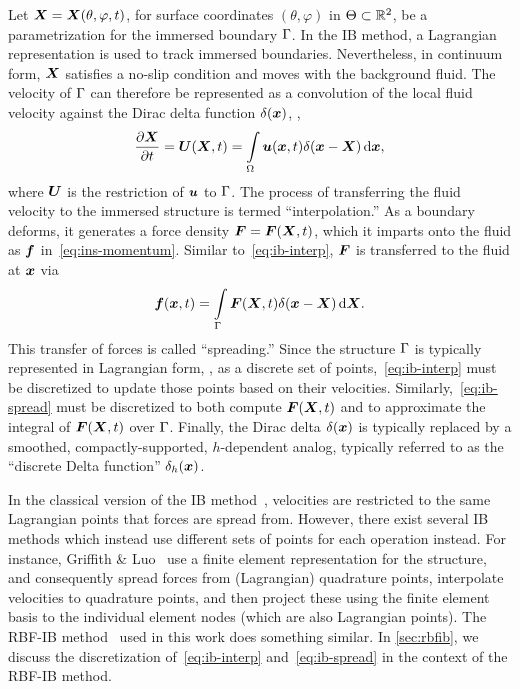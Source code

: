 Let $\boldsymbol{X} = \boldsymbol{X}(\theta, \varphi, t)$, for surface coordinates $(\theta, \varphi)$ in $\Theta\subset\mathbb{R}^2$, be a
parametrization for the immersed boundary $\Gamma$. In the IB method, a Lagrangian representation is used to
track immersed boundaries.  Nevertheless, in continuum form, $\boldsymbol{X}$ satisfies a no-slip condition and moves with the
background fluid. The velocity of $\Gamma$ can therefore be represented as a convolution of the local fluid
velocity against the Dirac delta function $\delta(\boldsymbol{x})$, ,
\begin{equation}\label{eq:ib-interp}
    \frac{\partial \X}{\partial t} = \U(\X, t) %
        = \int\limits_{\domain} \u(\x, t) \Dirac(\x-\X) \d\x,
\end{equation}
where $\boldsymbol{U}$ is the restriction of $\boldsymbol{u}$ to $\Gamma$.
The process of transferring the fluid velocity to the immersed structure is termed ``interpolation\qend.'' %
As a boundary deforms, it generates a force density $\boldsymbol{F} = \boldsymbol{F}(\boldsymbol{X}, t)$, which it imparts onto
the fluid as $\boldsymbol{f}$ in~\eqref{eq:ins-momentum}. Similar to~\eqref{eq:ib-interp}, $\boldsymbol{F}$ is transferred to the fluid at
$\boldsymbol{x}$ via
\begin{equation}\label{eq:ib-spread}
        \f(\x, t)
        = \int\limits_{\interface} \F(\X, t)\Dirac(\x-\X) \d\X.
\end{equation}
This transfer of forces is called ``spreading\qend.'' Since the structure $\Gamma$ is typically represented in
Lagrangian form, , as a discrete set of points,~\eqref{eq:ib-interp} must be discretized to update
those points based on their velocities. Similarly,~\eqref{eq:ib-spread} must be discretized to both compute
$\boldsymbol{F}(\boldsymbol{X}, t)$ and to approximate the integral of $\boldsymbol{F}(\boldsymbol{X}, t)$ over $\Gamma$. Finally, the Dirac delta
$\delta(\boldsymbol{x})$ is typically replaced by a smoothed, compactly-supported, $h$-dependent analog, typically referred to
as the ``discrete Delta function'' $\delta_h(\boldsymbol{x})$.

In the classical version of the IB method~\cite{Peskin:2002go}, velocities are restricted to the same Lagrangian
points that forces are spread from.  However, there exist several IB methods which instead use different sets of
points for each operation instead. For instance, Griffith \& Luo~\cite{Griffith:2017id} use a finite element
representation for the structure, and consequently spread forces from (Lagrangian) quadrature points, interpolate
velocities to quadrature points, and then project these using the finite element basis to the individual element
nodes (which are also Lagrangian points). The RBF-IB method~\cite{Shankar:2015km} used in this work does something
similar. In \cref{sec:rbfib}, we discuss the discretization of~\eqref{eq:ib-interp} and~\eqref{eq:ib-spread} in
the context of the RBF-IB method.

